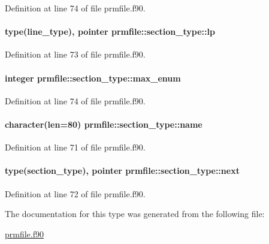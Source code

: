 Definition at line 74 of file prmfile.\-f90.

\hypertarget{structprmfile_1_1section__type_a6d9c8a02c4c1e430dcc10811b98afe05}{
\paragraph[{lp}]{\setlength{\rightskip}{0pt plus 5cm}type({\bf line\-\_\-type}), pointer prmfile\-::section\-\_\-type\-::lp}}\label{structprmfile_1_1section__type_a6d9c8a02c4c1e430dcc10811b98afe05}


Definition at line 73 of file prmfile.\-f90.

\hypertarget{structprmfile_1_1section__type_a7d9718bffe5edcc1168071b146462dc0}{
\paragraph[{max\-\_\-enum}]{\setlength{\rightskip}{0pt plus 5cm}integer prmfile\-::section\-\_\-type\-::max\-\_\-enum}}\label{structprmfile_1_1section__type_a7d9718bffe5edcc1168071b146462dc0}


Definition at line 74 of file prmfile.\-f90.

\hypertarget{structprmfile_1_1section__type_a80523b1519c9945d902931d811cf9f9f}{
\paragraph[{name}]{\setlength{\rightskip}{0pt plus 5cm}character(len=80) prmfile\-::section\-\_\-type\-::name}}\label{structprmfile_1_1section__type_a80523b1519c9945d902931d811cf9f9f}


Definition at line 71 of file prmfile.\-f90.

\hypertarget{structprmfile_1_1section__type_aca037ef3cf44e2306b3b3a5c3c6bf7b1}{
\paragraph[{next}]{\setlength{\rightskip}{0pt plus 5cm}type({\bf section\-\_\-type}), pointer prmfile\-::section\-\_\-type\-::next}}\label{structprmfile_1_1section__type_aca037ef3cf44e2306b3b3a5c3c6bf7b1}


Definition at line 72 of file prmfile.\-f90.



The documentation for this type was generated from the following file\-:\begin{DoxyCompactItemize}
\item 
\hyperlink{prmfile_8f90}{prmfile.\-f90}\end{DoxyCompactItemize}
